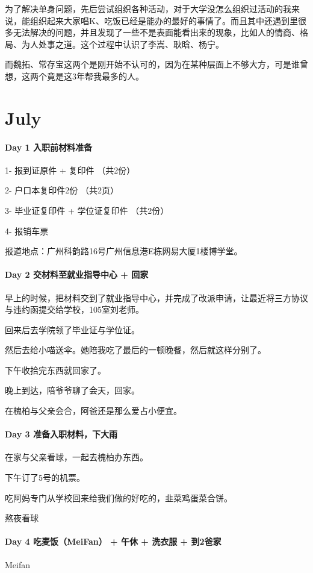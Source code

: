 \documentclass[UTF8,a4paper,8pt]{ctexart}
\begin{document}
 	 		为了解决单身问题，先后尝试组织各种活动，对于大学没怎么组织过活动的我来说，能组织起来大家唱K、吃饭已经是能办的最好的事情了。而且其中还遇到里很多无法解决的问题，并且发现了一些不是表面能看出来的现象，比如人的情商、格局、为人处事之道。这个过程中认识了李嵩、耿晗、杨宁。
 	 		
 	 		而魏拓、常存宝这两个是刚开始不认可的，因为在某种层面上不够大方，可是谁曾想，这两个竟是这3年帮我最多的人。
 	 		
 	 		
 	 	
\section{July}
 	 \paragraph{Day 1   入职前材料准备    \quad     }
 	 	1- 报到证原件 + 复印件    （共2份）
 	 
 	 	2- 户口本复印件2份		（共2页）
 	 	
 	 	3- 毕业证复印件 + 学位证复印件 	（共2份）
 	 	
 	 	4- 报销车票 
 	 	
 	 	报道地点：广州科韵路16号广州信息港E栋网易大厦1楼博学堂。
 	 \paragraph{Day 2   交材料至就业指导中心 + 回家   \quad     }
	 	 早上的时候，把材料交到了就业指导中心，并完成了改派申请，让最近将三方协议与违约函提交给学校，105室刘老师。
	 	 
	 	 回来后去学院领了毕业证与学位证。
	 	 
	 	 然后去给小喵送伞。她陪我吃了最后的一顿晚餐，然后就这样分别了。
	 	 
	 	 下午收拾完东西就回家了。
	 	 
	 	 晚上到达，陪爷爷聊了会天，回家。
	 	 
	 	 在槐柏与父亲会合，阿爸还是那么爱占小便宜。
	 	 
 	 \paragraph{Day 3    准备入职材料，下大雨   \quad     }
	 	 在家与父亲看球，一起去槐柏办东西。
	 	 
	 	 下午订了5号的机票。
	 	 
	 	 吃阿妈专门从学校回来给我们做的好吃的，韭菜鸡蛋菜合饼。
	 
		 熬夜看球	 
 	 \paragraph{Day 4    吃麦饭（MeiFan） + 午休 + 洗衣服 + 到2爸家  \quad     }
	 	Meifan
	 	
\end{document}
